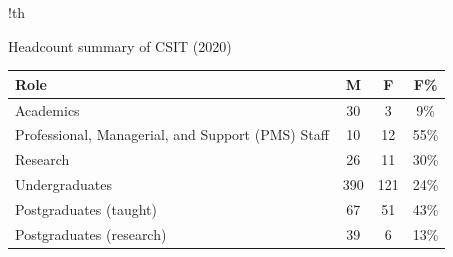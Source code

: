 \begin{tabbox}[11cm]{!th}

\caption[Headcount summary of CSIT]{Headcount summary of CSIT (2020)}
\label{tab:headcount}
\footnotesize   
\begin{tabular}{p{8cm} 
                S[table-format=3.0]
                !{\qquad}
                S[table-format=2.0]
                !{\qquad}
                S[table-format=2.0\%]} 

\toprule 
Role & {M} & {F} & {F\%} \\
\midrule 
Academics & 30 & 3 & 9\%\\
\hdashline
Professional, Managerial, and Support (PMS) Staff & 10 & 12 & 55\%\\
\hdashline
Research & 26 & 11 & 30\%\\
\hdashline
Undergraduates & 390 & 121 & 24\%\\
\hdashline
Postgraduates (taught) & 67 & 51 & 43\%\\
\hdashline
Postgraduates (research) & 39 & 6 & 13\%\\

\bottomrule 
\end{tabular}

\end{tabbox}

